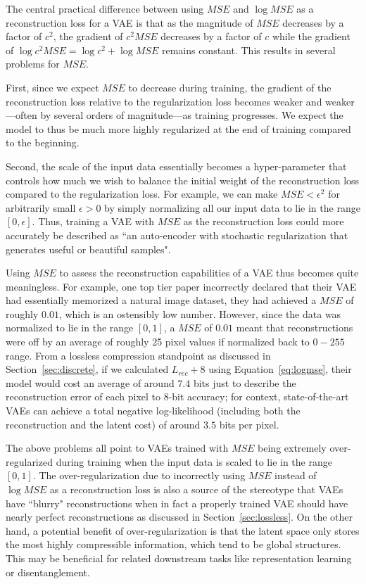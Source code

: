 \documentclass{article}
\begin{document}
The central practical difference between using $MSE$ and $\log MSE$ as a reconstruction loss for a VAE is that as the magnitude of $MSE$ decreases by a factor of $c^2$, the gradient of $c^2 MSE$ decreases by a factor of $c$ while the gradient of $\log c^2 MSE = \log c^2 + \log MSE$ remains constant. This results in several problems for $MSE$.

First, since we expect $MSE$ to decrease during training, the gradient of the reconstruction loss relative to the regularization loss becomes weaker and weaker---often by several orders of magnitude---as training progresses. We expect the model to thus be much more highly regularized at the end of training compared to the beginning.

Second, the scale of the input data essentially becomes a hyper-parameter that controls how much we wish to balance the initial weight of the reconstruction loss compared to the regularization loss. For example, we can make $MSE < \epsilon^2$ for arbitrarily small $\epsilon>0$ by simply normalizing all our input data to lie in the range $[0,\epsilon]$. Thus, training a VAE with $MSE$ as the reconstruction loss could more accurately be described as ``an auto-encoder with stochastic regularization that generates useful or beautiful samples".

Using $MSE$ to assess the reconstruction capabilities of a VAE thus becomes quite meaningless. For example, one top tier paper incorrectly declared that their VAE had essentially memorized a natural image dataset, they had achieved a $MSE$ of roughly $0.01$, which is an ostensibly low number.
However, since the data was normalized to lie in the range $[0,1]$, a $MSE$ of $0.01$ meant that reconstructions were off by an average of roughly 25 pixel values if normalized back to $0-255$ range. From a lossless compression standpoint as discussed in Section~\ref{sec:discrete}, if we calculated $L_{rec}+8$ using Equation~\ref{eq:logmse}, their model would cost an average of around $7.4$ bits just to describe the reconstruction error of each pixel to $8$-bit accuracy; for context, state-of-the-art VAEs can achieve a total negative log-likelihood (including both the reconstruction and the latent cost) of around $3.5$ bits per pixel.

The above problems all point to VAEs trained with $MSE$ being extremely over-regularized during training when the input data is scaled to lie in the range $[0,1]$.
The over-regularization due to incorrectly using $MSE$ instead of $\log MSE$ as a reconstruction loss is also a source of the stereotype that VAEs have ``blurry" reconstructions when in fact a properly trained VAE should have nearly perfect reconstructions as discussed in Section~\ref{sec:lossless}.
On the other hand, a potential benefit of over-regularization is that the latent space only stores the most highly compressible information, which tend to be global structures. This may be beneficial for related downstream tasks like representation learning or disentanglement.
\end{document}
